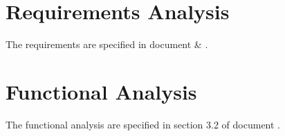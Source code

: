 \section{Requirements Analysis}
The requirements are specified in document \srshq{} \& \srsdis.


\section{Functional Analysis}
The functional analysis are specified in section 3.2 of document \pdd.


